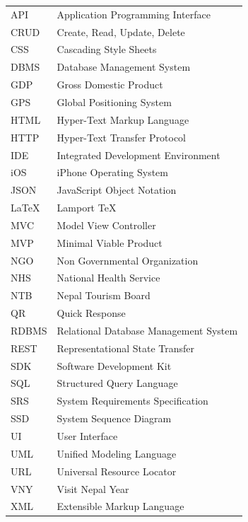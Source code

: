 \documentclass[12pt, a4paper, oneside]{article}
\begin{document}
\renewcommand{\arraystretch}{1.2}
\begin{table}[H]
\begin{tabular}{ll}

API & Application Programming Interface\\
CRUD	& Create, Read, Update, Delete\\
CSS		& Cascading Style Sheets\\
DBMS	& Database Management System\\
GDP		& Gross Domestic Product\\
GPS		& Global Positioning System\\
HTML	& Hyper-Text Markup Language\\
HTTP	& Hyper-Text Transfer Protocol\\
IDE		& Integrated Development Environment\\
iOS		& iPhone Operating System\\
JSON &	JavaScript Object Notation\\
LaTeX	& Lamport TeX\\
MVC		& Model View Controller\\
MVP		& Minimal Viable Product\\
NGO		& Non Governmental Organization\\
NHS		& National Health Service\\
NTB		& Nepal Tourism Board\\
QR		& Quick Response\\
RDBMS	& Relational Database Management System\\
REST	& Representational State Transfer\\
SDK		& Software Development Kit\\
SQL		& Structured Query Language\\
SRS		& System Requirements Specification\\
SSD		& System Sequence Diagram\\
UI		& User Interface\\
UML		& Unified Modeling Language\\
URL		& Universal Resource Locator\\
VNY		& Visit Nepal Year\\
XML		& Extensible Markup Language\\
\end{tabular}
\end{table}


\break

\cfoot{\textbf{\thepage} /  \pageref{LastPage}}
\normalsize
{}
\end{document}
